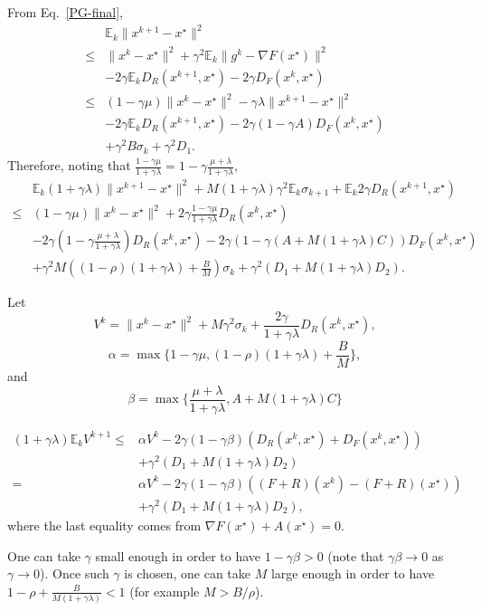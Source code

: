 \documentclass{article}
\newcommand{\bE}{{\mathbb E}}
\theoremstyle{definition}
\begin{document}
From Eq.~\eqref{PG-final},
\begin{align}
    &\bE_k\|x^{k+1} - x^\star\|^2 \\
    \leq& \|x^k - x^\star\|^2 + \gamma^2 \bE_k\|g^k - \nabla F(x^\star) \|^2\\
    &- 2\gamma \bE_k D_R(x^{k+1},x^\star) - 2\gamma D_F(x^{k},x^\star)\\
    \leq& (1-\gamma \mu)\|x^k - x^\star\|^2 - \gamma \lambda \|x^{k+1} - x^\star\|^2\\
    &- 2\gamma \bE_k D_R(x^{k+1},x^\star) - 2\gamma(1 - \gamma A) D_F(x^{k},x^\star)\\
    &+ \gamma^2 B \sigma_k + \gamma^2 D_1.
\end{align}
Therefore, noting that $\frac{1-\gamma\mu}{1+\gamma\lambda} = 1-\gamma\frac{\mu+\lambda}{1+\gamma\lambda}$,
\begin{align}
    &\bE_k (1+\gamma \lambda)\|x^{k+1} - x^\star\|^2 + M(1+\gamma\lambda)\gamma^2 \bE_k \sigma_{k+1} + \bE_k 2\gamma D_R(x^{k+1},x^\star)\\
    \leq& (1-\gamma\mu)\|x^k - x^\star\|^2 + 2\gamma \frac{1-\gamma\mu}{1+\gamma\lambda} D_R(x^{k},x^\star)\\
    &- 2\gamma \left(1-\gamma\frac{\mu+\lambda}{1+\gamma\lambda}\right) D_R(x^{k},x^\star) - 2\gamma(1 - \gamma (A + M(1+\gamma\lambda)C)) D_F(x^{k},x^\star)\\
    &+ \gamma^2 M \left((1-\rho)(1+\gamma\lambda) + \frac{B}{M}\right)\sigma_k + \gamma^2 (D_1 + M(1+\gamma\lambda)D_2).
\end{align}

Let $$V^k = \|x^{k} - x^\star\|^2 + M\gamma^2 \sigma_{k} +  \frac{2\gamma}{1+\gamma\lambda} D_R(x^{k},x^\star),$$ $$\alpha = \max\{1-\gamma\mu, (1-\rho)(1+\gamma\lambda) + \frac{B}{M}\},$$
and 
$$
\beta = \max\{\frac{\mu+\lambda}{1+\gamma\lambda},A + M(1+\gamma\lambda)C\}
$$

\begin{align}
    (1+\gamma\lambda)\bE_k V^{k+1}
    \leq& \alpha V^k - 2\gamma (1-\gamma\beta) (D_R(x^{k},x^\star) + D_F(x^{k},x^\star))\\
    &+\gamma^2 (D_1 + M(1+\gamma\lambda)D_2)\\
    =& \alpha V^k - 2\gamma (1-\gamma\beta) ((F+R)(x^k) - (F+R)(x^\star))\\
    &+\gamma^2 (D_1 + M(1+\gamma\lambda)D_2),
\end{align}
where the last equality comes from $\nabla F(x^\star) + A(x^\star) = 0$.

One can take $\gamma$ small enough in order to have $1-\gamma\beta >0$ (note that $\gamma \beta \to 0$ as $\gamma \to 0$). Once such $\gamma$ is chosen, one can take $M$ large enough in order to have $1-\rho + \frac{B}{M(1+\gamma\lambda)} < 1$ (for example $M > B/\rho$).
\end{document}
